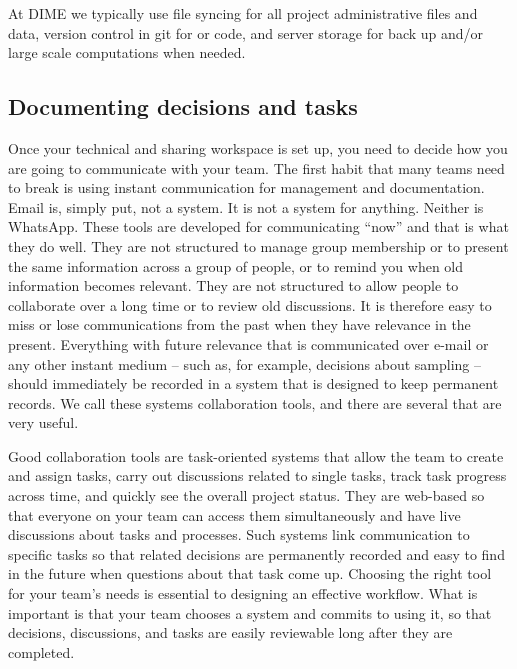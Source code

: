At DIME we typically use file syncing for all project administrative files and data,
version control in git for or code,
and server storage for back up and/or large scale computations when needed.

\subsection{Documenting decisions and tasks}

Once your technical and sharing workspace is set up,
you need to decide how you are going to communicate with your team.
The first habit that many teams need to break
is using instant communication for management and documentation.
Email is, simply put, not a system. It is not a system for anything. Neither is WhatsApp.
These tools are developed for communicating ``now'' and that is what they do well.
They are not structured to manage group membership or to present the same information
across a group of people, or to remind you when old information becomes relevant.
They are not structured to allow people to collaborate over a long time or to review old discussions.
It is therefore easy to miss or lose communications from the past when they have relevance in the present.
Everything with future relevance that is communicated over e-mail or any other instant medium
-- such as, for example, decisions about sampling --
should immediately be recorded in a system that is designed to keep permanent records.
We call these systems collaboration tools, and there are several that are very useful.

Good collaboration tools are task-oriented systems
that allow the team to create and assign tasks,
carry out discussions related to single tasks,
track task progress across time, and quickly see the overall project status.
They are web-based so that everyone on your team can access them simultaneously
and have live discussions about tasks and processes.
Such systems link communication to specific tasks so that
related decisions are permanently recorded
and easy to find in the future when questions about that task come up.
Choosing the right tool for your team's needs is essential to designing an effective workflow.
What is important is that your team chooses a system and commits to using it,
so that decisions, discussions, and tasks are easily reviewable long after they are completed.

